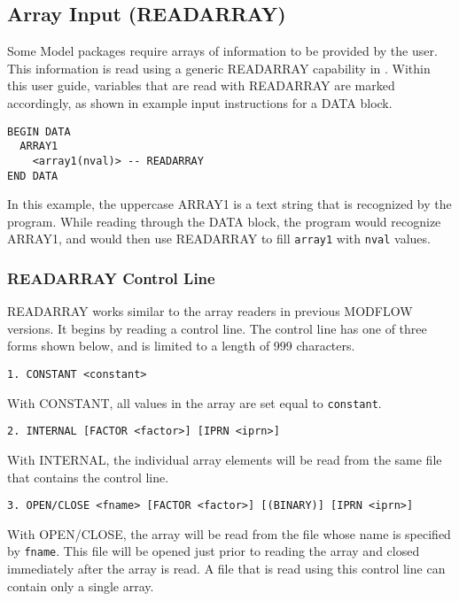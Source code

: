 \subsection{Array Input (READARRAY)}
Some \mf Model packages require arrays of information to be provided by the user.  This information is read using a generic READARRAY capability in \mf.  Within this user guide, variables that are read with READARRAY are marked accordingly, as shown in example input instructions for a DATA block.  

\begin{lstlisting}[style=blockdefinition]
BEGIN DATA
  ARRAY1
    <array1(nval)> -- READARRAY
END DATA
\end{lstlisting}

\noindent In this example, the uppercase ARRAY1 is a text string that is recognized by the program.  While reading through the DATA block, the program would recognize ARRAY1, and would then use READARRAY to fill \texttt{array1} with \texttt{nval} values.

\subsubsection{READARRAY Control Line}

READARRAY works similar to the array readers in previous MODFLOW versions.  It begins by reading a control line.  The control line has one of three forms shown below, and is limited to a length of 999 characters.

\begin{lstlisting}[style=blockdefinition]
1. CONSTANT <constant> 
\end{lstlisting}
With CONSTANT, all values in the array are set equal to \texttt{constant}. 

\begin{lstlisting}[style=blockdefinition]
2. INTERNAL [FACTOR <factor>] [IPRN <iprn>] 
\end{lstlisting}
With INTERNAL, the individual array elements will be read from the same file that contains the control line. 

\begin{lstlisting}[style=blockdefinition]
3. OPEN/CLOSE <fname> [FACTOR <factor>] [(BINARY)] [IPRN <iprn>]
\end{lstlisting}
With OPEN/CLOSE, the array will be read from the file whose name is specified by \texttt{fname}. This file will be opened just prior to reading the array and closed immediately after the array is read. A file that is read using this control line can contain only a single array. 

